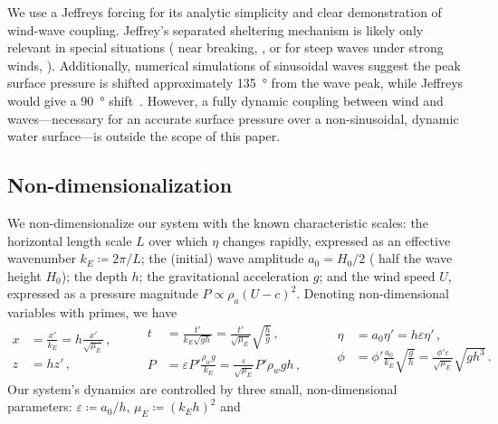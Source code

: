 \documentclass{jfm}
\renewcommand*{\epsilon}{\varepsilon}
\begin{document}
We use a Jeffreys forcing for its analytic simplicity and clear
demonstration of wind-wave coupling.
Jeffrey's separated sheltering mechanism is likely only relevant
in special situations (\eg{} near breaking,
\citealp{banner1976separation}, or for steep waves under strong winds,
\citealp{tian2013evolution,touboul2006interaction}).
Additionally, numerical simulations of sinusoidal waves suggest the peak
surface pressure is shifted approximately \SI{135}{\degree} from the
wave peak, while Jeffreys would give a \SI{90}{\degree}
shift~\citep{husain2019boundary}.
However, a fully dynamic coupling between wind and waves---necessary for
an accurate surface pressure over a non-sinusoidal, dynamic water
surface---is outside the scope of this paper.

\subsection{\label{sec:nondim} Non-dimensionalization}
We non-dimensionalize our system with the known characteristic
scales: the horizontal length scale $L$ over which $\eta$ changes
rapidly, expressed as an effective wavenumber $k_E \coloneqq 2 \pi/L$;
the (initial) wave amplitude $a_0 = H_0/2$ (\ie{} half the wave height
$H_0$); the depth $h$; the gravitational acceleration $g$; and the wind
speed $U$, expressed as a pressure magnitude $P \propto \rho_a (U-c)^2$.
Denoting non-dimensional variables with primes, we have
\begin{equation}
  \begin{aligned}
  x &= \frac{x'}{k_E} = h \frac{x'}{\sqrt{\mu_E}}\,, \\
  z &= h z' \,,
  \end{aligned}
  \qquad
  \begin{aligned}
  t &= \frac{t'}{k_E\sqrt{g h}}
    = \frac{t'}{\sqrt{\mu_E}} \sqrt{\frac{h}{g}} \,, \\
  P &= \epsilon P' \frac{\rho_w g}{k_E}
    = \frac{\epsilon}{\sqrt{\mu_E}} P' \rho_w g h \,,
  \end{aligned}
  \qquad
  \begin{aligned}
  \eta &= a_0 \eta' = h \epsilon \eta' \,, \\
  \phi &= \phi'\frac{a_0}{k_E}\sqrt{\frac{g}{h}}
    = \frac{\phi'\epsilon}{\sqrt{\mu_E}}\sqrt{g h^3} \,.
  \end{aligned}
\end{equation}
Our system's dynamics are controlled by three small, non-dimensional
parameters: $\epsilon \coloneqq a_0/h$, $\mu_E \coloneqq (k_E h)^2$ and
\end{document}
